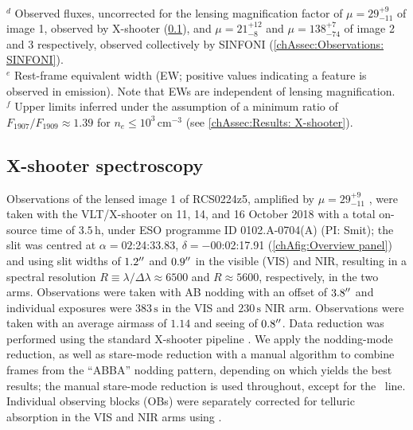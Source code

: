\begin{table}
    \\
    $^d$ Observed fluxes, uncorrected for the lensing magnification factor of $\mu = 29_{-11}^{+9}$ of image 1, observed by X-shooter (\cref{chAssec:Observations: X-shooter}), and $\mu = 21_{-8}^{+12}$ and $\mu = 138_{-74}^{+7}$ of image 2 and 3 respectively, observed collectively by SINFONI (\cref{chAssec:Observations: SINFONI}).
    \\
    $^e$ Rest-frame equivalent width (EW; positive values indicating a feature is observed in emission). Note that EWs are independent of lensing magnification.
    \\
    $^f$ Upper limits inferred under the assumption of a minimum ratio of $F_{1907}/F_{1909} \approx 1.39$ for $n_e \leq 10^3 \, \mathrm{cm^{-3}}$ (see \cref{chAssec:Results: X-shooter}).
    \label{chAtab:Results}
\end{table}

\subsection{X-shooter spectroscopy}
\label{chAssec:Observations: X-shooter}

Observations of the lensed image 1 of RCS0224z5, amplified by $\mu = 29_{-11}^{+9}$ \citep[luminosity-weighted; see][]{2017MNRAS.467.3306S}, were taken with the VLT/X-shooter \citep{2011A&A...536A.105V} on 11, 14, and 16 October 2018 with a total on-source time of $3.5 \, \mathrm{h}$, under ESO programme ID 0102.A-0704(A) (PI: Smit); the slit was centred at $\alpha = 02$:24:33.83, $\delta = -00$:02:17.91 (\cref{chAfig:Overview panel}) and using slit widths of $1.2 \hbox{$^{\prime\prime}$}$ and $0.9 \hbox{$^{\prime\prime}$}$ in the visible (VIS) and NIR, resulting in a spectral resolution $R \equiv \lambda/\Delta \lambda \approx 6500$ and $R \approx 5600$, respectively, in the two arms. Observations were taken with AB nodding with an offset of $3.8 \hbox{$^{\prime\prime}$}$ and individual exposures were $383 \, \mathrm{s}$ in the VIS and $230 \, \mathrm{s}$ NIR arm. Observations were taken with an average airmass of $1.14$ and seeing of $0.8 \hbox{$^{\prime\prime}$}$. Data reduction was performed using the standard  X-shooter pipeline \citep{2013A&A...559A..96F}. We apply the nodding-mode reduction, as well as stare-mode reduction with a manual algorithm to combine frames from the ``ABBA'' nodding pattern, depending on which yields the best results; the manual stare-mode reduction is used throughout, except for the \CIV\ line. Individual observing blocks (OBs) were separately corrected for telluric absorption in the VIS and NIR arms using  \citep{2015A&A...576A..77S, 2015A&A...576A..78K}.


